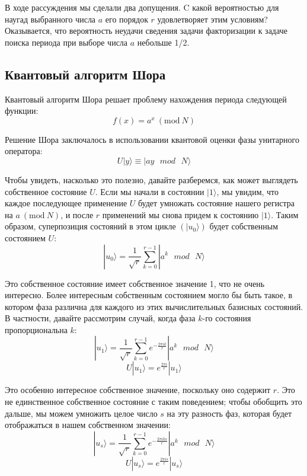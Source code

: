 \documentclass[14pt]{article}
\newcommand{\Mod}[1]{\ (\mathrm{mod}\ #1)}
\begin{document}
	В ходе рассуждения мы сделали два допущения. C какой вероятностью для наугад выбранного числа $a$ его порядок $r$ удовлетворяет этим условиям? Оказывается, что вероятность неудачи сведения задачи факторизации к задаче поиска периода при выборе числа $a$ небольше 1/2.
	
	\newpage
	\subsection{Квантовый алгоритм Шора}
	
	Квантовый алгоритм Шора решает проблему нахождения периода следующей функции:
	\begin{equation}
		f(x) = a^x \Mod{N}
	\end{equation}
	
	Решение Шора заключалось в использовании квантовой оценки фазы унитарного оператора:
	\begin{equation}
		U|y \rangle \equiv |ay \text{ } mod \text{ } N \rangle
	\end{equation}
	
	Чтобы увидеть, насколько это полезно, давайте разберемся, как может выглядеть собственное состояние $U$. Если мы начали в состоянии $|1 \rangle$, мы увидим, что каждое последующее применение $U$ будет умножать состояние нашего регистра на $a \Mod{N}$, и после $r$ применений мы снова придем к состоянию $|1 \rangle$. Таким образом, суперпозиция состояний в этом цикле $(|u_0 \rangle)$ будет собственным состоянием $U$:
	\begin{equation}
		|u_0 \rangle = \frac{1}{\sqrt{r}} \sum_{k=0}^{r-1} |a^k \text{ } mod \text{ } N \rangle
	\end{equation}
	
	Это собственное состояние имеет собственное значение 1, что не очень интересно. Более интересным собственным состоянием могло бы быть такое, в котором фаза различна для каждого из этих вычислительных базисных состояний. В частности, давайте рассмотрим случай, когда фаза $k$-го состояния пропорциональна $k$:
	 \begin{equation}
		|u_1 \rangle = \frac{1}{\sqrt{r}} \sum_{k=0}^{r-1} e^{-\frac{2 \pi i k}{r}} |a^k \text{ } mod \text{ } N \rangle
	\end{equation}
	\begin{equation}
		U|u_1 \rangle = e^{\frac{2 \pi i}{r}} |u_1 \rangle
	\end{equation}
	
	Это особенно интересное собственное значение, поскольку оно содержит $r$. Это не единственное собственное состояние с таким поведением; чтобы обобщить это дальше, мы можем умножить целое число $s$ на эту разность фаз, которая будет отображаться в нашем собственном значении: 
	 \begin{equation}
		|u_s \rangle = \frac{1}{\sqrt{r}} \sum_{k=0}^{r-1} e^{-\frac{2 \pi i k s}{r}} |a^k \text{ } mod \text{ } N \rangle
	\end{equation}
	\begin{equation}
		U|u_s \rangle = e^{\frac{2 \pi i s}{r}} |u_s \rangle
	\end{equation}
	
\end{document}
